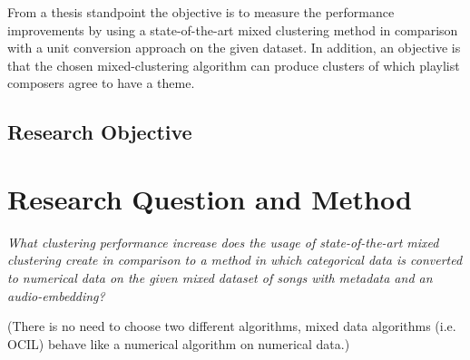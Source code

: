 \documentclass[a4paper,11pt]{article}
\begin{document}
From a thesis standpoint the objective is to measure the performance improvements by using a state-of-the-art mixed clustering method in comparison with a unit conversion approach on the given dataset. In addition, an objective is that the chosen mixed-clustering algorithm can produce clusters of which playlist composers agree to have a theme.

\subsection{Research Objective}

\section{Research Question and Method}



\textit{What clustering performance increase does the usage of state-of-the-art mixed clustering create in comparison to a method in which categorical data is converted to numerical data on the given mixed dataset of songs with metadata and an audio-embedding?}

(There is no need to choose two different algorithms, mixed data algorithms (i.e. OCIL) behave like a numerical algorithm on numerical data.)


\end{document}
